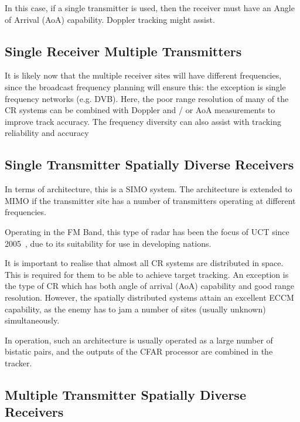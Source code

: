 \documentclass[english, 12pt]{report}
\begin{document}
In this case, if a single transmitter is used, then the receiver must have an Angle of Arrival (AoA) capability. Doppler tracking might assist.

\subsection{Single Receiver Multiple Transmitters}

It is likely now that the multiple receiver sites will have different frequencies, since the broadcast frequency planning will ensure this: the exception is single frequency networks (e.g. DVB). Here, the poor range resolution of many of the CR systems can be combined with Doppler and / or AoA measurements to improve track accuracy. The frequency diversity can also assist with tracking reliability and accuracy ~\cite{edrich1}


\subsection{Single Transmitter Spatially Diverse Receivers}

In terms of architecture, this is a SIMO system. The architecture is extended to MIMO if the transmitter site has a number of transmitters operating at different frequencies.

Operating in the FM Band, this type of radar has been the focus of UCT since 2005~\cite{maasdorp2014cramer,tong2011processing,tong:12,inggs2014planning,paichard2009multistatic,nadjiasngar2011new,morrison:07a,morrison:07b}, due to its suitability for use in developing nations.

It is important to realise that almost all CR systems are distributed in space. This is required for them to be able to achieve target tracking. An exception is the type of CR which has both angle of arrival (AoA) capability and good range resolution. However, the spatially distributed systems attain an excellent ECCM capability, as the enemy has to jam a number of sites (usually unknown) simultaneously.

In operation, such an architecture is usually operated as a large number of bistatic pairs, and the outputs of the CFAR processor are combined in the tracker.

\subsection{Multiple Transmitter Spatially Diverse Receivers}
\end{document}

